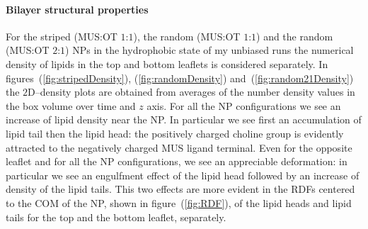 \paragraph{\textbf{Bilayer structural properties}}
For the striped (\ac{MUS}:\ac{OT} $1$:$1$), the random (\ac{MUS}:\ac{OT} $1$:$1$) and the random (\ac{MUS}:\ac{OT} $2$:$1$) \acp{NP} in the hydrophobic state of my unbiased runs the numerical density of lipids in the top and bottom leaflets is considered separately. In figures~(\ref{fig:stripedDensity}), (\ref{fig:randomDensity}) and~(\ref{fig:random21Density}) the $2$D--density plots are obtained from averages of the number density values in the box volume over time and $z$ axis. For all the \ac{NP} configurations we see an increase of lipid density near the \ac{NP}. In particular we see first an accumulation of lipid tail then the lipid head: the positively charged choline group is evidently attracted to the negatively charged \ac{MUS} ligand terminal. Even for the opposite leaflet and for all the \ac{NP} configurations, we see an appreciable deformation: in particular we see an engulfment effect of the lipid head followed by an increase of density of the lipid tails. This two effects are more evident in the \acp{RDF} centered to the \ac{COM} of the \ac{NP}, shown in figure~(\ref{fig:RDF}), of the lipid heads and lipid tails for the top and the bottom leaflet, separately.

